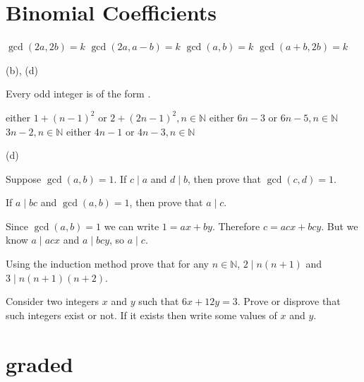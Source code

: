 \documentclass[12pt, answers, a4paper]{exam}
\begin{document}
  \section{Binomial Coefficients}
\begin{questions}
\question 
\begin{choices}
    \choice $\gcd(2a,2b) = k$
    \choice $\gcd(2a,a-b) = k$
    \choice $\gcd(a,b) = k$
    \choice $\gcd(a+b,2b) = k$
\end{choices}
\begin{solution}
    (b), (d)
\end{solution}

\question Every odd integer is of the form \fillin.
\begin{choices}
    \choice either $1 + (n-1)^2$ or $2+ (2n-1)^2, n \in \mathbb{N}$ 
    \choice either $6n-3$ or $6n-5, n \in \mathbb{N}$
    \choice $3n-2, n \in \mathbb{N}$
    \choice either $4n-1$ or $4n-3, n \in \mathbb{N}$
\end{choices}
\begin{solution}
    (d)
\end{solution}

\question[2] Suppose $\gcd(a,b) = 1$. If $c\mid a$ and $d\mid b$, then prove that $\gcd(c,d) = 1$.

\question[2]  If $a\mid bc$ and $\gcd(a,b) = 1$, then prove that $a\mid c$.
\noprintanswers
\begin{solution}
Since $\gcd(a, b) = 1$ we can write $1 = ax + by$. Therefore $c = acx + bcy$. But we know $a\mid acx$ and $a\mid bcy$, so $a\mid c$.    
\end{solution}





\question Using the induction method  prove that for any $n \in \mathbb{N}$, $2\mid n(n+1)$ and $3 \mid n(n+1)(n+2)$.

\question Consider two integers $x$ and $y$ such that $6x+12y=3$. Prove or disprove that such integers exist or not. If it exists then write some values of $x$ and $y$.
\end{questions}

\section*{graded}
\end{document}
